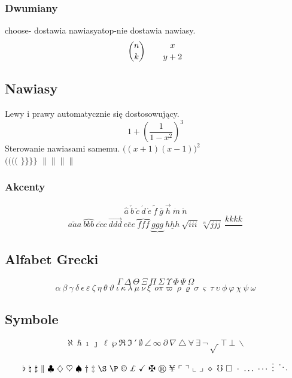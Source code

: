 \documentclass[a4paper,12pt]{article}
\begin{document}
\subsubsection{Dwumiany}
choose- dostawia nawiasy\newline atop-nie dostawia nawiasy.
\begin{equation}
{n\choose k}\qquad {x \atop y+2}
\end{equation}
\subsection{Nawiasy}
Lewy i prawy automatycznie się dostosowujący.
\begin{equation}
1+\left(\frac{1}{1-x^2} 
\right)^3
\end{equation}
Sterowanie nawiasami samemu.\newline
$\Big( (x+1)(x-1) \Big)^{2}$\\
$\big(\Big(\bigg(\Bigg($\qquad
$\big\}\Big\}\bigg\}\Bigg\}$\qquad
$\big\|\Big\|\bigg\|\Bigg\|$

\subsubsection{Akcenty}
$$\hat{a} \ \check{b}\ \breve{c}\ \acute{d} \ \grave{e}\ \tilde{f} \ \bar{g} \ \vec{h} \ \dot{m}
\ \ddot{n}$$
$$\widetilde{aaa} \ \widehat{bbb}\ \overleftarrow{ccc} \ \overrightarrow{ddd}\ \overline{eee} \ \overbrace{fff} \ \underbrace{ggg} \ \underline{hhh} \ \sqrt{iii}  \ 
\sqrt[n]{jjj} \ \frac{kkkk}{}$$

\subsection{Alfabet Grecki}
$$\Gamma \ \Delta \ \Theta \ \Xi \ \Pi \ \Sigma \ \Upsilon \ \Phi \ \Psi \ \Omega$$
$$\alpha \ \beta \ \gamma \ \delta \ \epsilon \ \varepsilon \ \zeta \ \eta \ \theta \
\vartheta \ \iota \ \kappa \ \lambda \ \mu \ \nu \ \xi \ \ o \pi \varpi \ \rho \ \varrho \ \sigma 
\ \varsigma  \ \tau \ \upsilon \ \phi \ \varphi \ \chi \ \psi \ \omega  $$

\subsection{Symbole}
$$\aleph \ \hbar \ \imath \ \jmath \ \ell \ \wp \ \Re \ \Im \ \prime \ \emptyset \ \angle \ \infty \ \partial \ \nabla \ \triangle \ \forall \ \exists \ \neg \ \surd  \ \top \ \bot \ \backslash$$
$$\flat \ \natural \ \sharp \ \| \ \clubsuit \ \diamondsuit \ \heartsuit \ \spadesuit \ \dag \ \ddag\ \S \ \P \ \copyright \ \pounds \ \checkmark \ \maltese \ \circledR \ \yen \ \ulcorner \ \urcorner \ \llcorner \ \lrcorner \ \diamond \ \mho \ \Box \ \cdot \ \ldots \ \cdots \ \vdots \ \ddots$$
\end{document}
